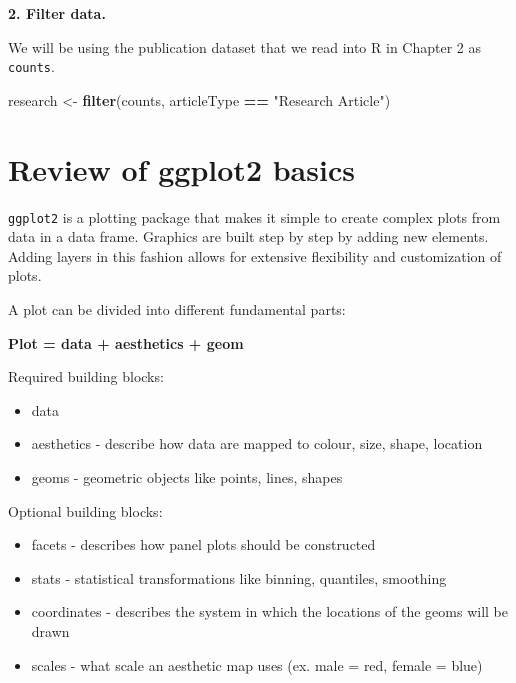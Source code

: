 \documentclass[
]{book}
\newenvironment{Shaded}{\begin{snugshade}}{\end{snugshade}}
\newcommand{\KeywordTok}[1]{\textcolor[rgb]{0.13,0.29,0.53}{\textbf{#1}}}
\newcommand{\NormalTok}[1]{#1}
\newcommand{\OperatorTok}[1]{\textcolor[rgb]{0.81,0.36,0.00}{\textbf{#1}}}
\newcommand{\StringTok}[1]{\textcolor[rgb]{0.31,0.60,0.02}{#1}}
\providecommand{\tightlist}{%
  \setlength{\itemsep}{0pt}\setlength{\parskip}{0pt}}
\begin{document}
\textbf{2. Filter data.}

We will be using the publication dataset that we read into R in Chapter 2 as \texttt{counts}.

\begin{Shaded}
\begin{Highlighting}[]
\NormalTok{research <-}\StringTok{ }\KeywordTok{filter}\NormalTok{(counts, articleType }\OperatorTok{==}\StringTok{ "Research Article"}\NormalTok{)}
\end{Highlighting}
\end{Shaded}

\hypertarget{review-of-ggplot2-basics}{%
\section{Review of ggplot2 basics}\label{review-of-ggplot2-basics}}

\texttt{ggplot2} is a plotting package that makes it simple to create complex plots from data in a data frame. Graphics are built step by step by adding new elements. Adding layers in this fashion allows for extensive flexibility and customization of plots.

A plot can be divided into different fundamental parts:

\textbf{Plot = data + aesthetics + geom}

Required building blocks:

\begin{itemize}
\tightlist
\item
  data
\item
  aesthetics - describe how data are mapped to colour, size, shape, location
\item
  geoms - geometric objects like points, lines, shapes
\end{itemize}

Optional building blocks:

\begin{itemize}
\tightlist
\item
  facets - describes how panel plots should be constructed
\item
  stats - statistical transformations like binning, quantiles, smoothing
\item
  coordinates - describes the system in which the locations of the geoms will be drawn
\item
  scales - what scale an aesthetic map uses (ex. male = red, female = blue)
\end{itemize}
\end{document}
